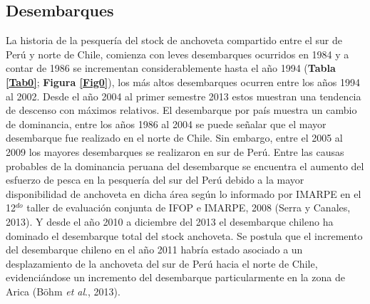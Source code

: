 \documentclass[letter,11pt]{article}
\begin{document}
\subsection{Desembarques}


La historia de la pesquer\'ia del stock de anchoveta compartido entre el
sur de Per\'u y norte de Chile, comienza con leves desembarques ocurridos
en 1984 y a contar de 1986 se incrementan considerablemente hasta el a\~{n}o
1994 (\textbf{Tabla \ref{Tab0}}; \textbf{Figura \ref{Fig0}}), los m\'as
altos desembarques ocurren entre los a\~{n}os 1994 al 2002. Desde el a\~{n}o
2004 al primer semestre 2013 estos muestran una tendencia de descenso
con m\'aximos relativos. El desembarque por pa\'is muestra un cambio de
dominancia, entre los a\~{n}os 1986 al 2004 se puede se\~{n}alar que el mayor
desembarque fue realizado en el norte de Chile. Sin embargo, entre el 2005 al 2009
los mayores desembarques se realizaron en sur de Per\'u. Entre las causas
probables de la dominancia peruana del desembarque se encuentra el
aumento del esfuerzo de pesca en la pesquer\'ia del sur del Per\'u debido a
la mayor disponibilidad de anchoveta en dicha \'area seg\'un lo informado
por IMARPE en el 12$^{do}$ taller de evaluaci\'on conjunta de IFOP e IMARPE,
2008 (Serra y Canales, 2013). Y desde el a\~{n}o 2010 a diciembre del 2013
el desembarque chileno ha dominado el desembarque total del stock
anchoveta. Se postula que el incremento del desembarque chileno en el
a\~{n}o 2011 habr\'ia estado asociado a un desplazamiento de la anchoveta del
sur de Per\'u hacia el norte de Chile, evidenci\'andose un incremento del
desembarque particularmente en la zona de Arica (B\"ohm \textit{et al}.,
2013).\\
\end{document}
